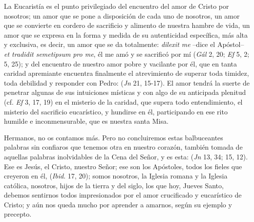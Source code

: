 \begin{body}
La Eucaristía es el punto privilegiado del encuentro del amor de Cristo por nosotros; un amor que se pone a disposición de cada uno de nosotros, un amor que se convierte en cordero de sacrificio y alimento de nuestra hambre de vida, un amor que se expresa en la forma y medida de su autenticidad específica, más alta y exclusiva, es decir, un amor que se da totalmente: \textit{dilexit me} –dice el Apóstol– \textit{et tradidit semetipsum} \textit{pro me}, él me amó y se sacrificó por mí (\textit{Gál} 2, 20; \textit{Ef} 5, 2; 5, 25); y del encuentro de nuestro amor pobre y vacilante por él, que en tanta caridad apremiante encuentra finalmente el atrevimiento de superar toda timidez, toda debilidad y responder con Pedro:  (\textit{Jn} 21, 15-17). El amor tendrá la suerte de penetrar algunas de sus intuiciones místicas y con algo de su anticipada plenitud (cf. \textit{Ef} 3, 17, 19) en el misterio de la caridad, que supera todo entendimiento, el misterio del sacrificio eucarístico, y hundirse en él, participando en ese rito humilde e inconmensurable, que es nuestra santa Misa. 

Hermanos, no os contamos más. Pero no concluiremos estas balbuceantes palabras sin confiaros que tenemos otra en nuestro corazón, también tomada de aquellas palabras inolvidables de la Cena del Señor, y es esta:  (\textit{Jn} 13, 34; 15, 12). Ese  es Jesús, el Cristo, nuestro Señor; ese  son los Apóstoles, todos los fieles que creyeron en él,  (\textit{Ibid}. 17, 20); somos nosotros, la Iglesia romana y la Iglesia católica, nosotros, hijos de la tierra y del siglo, los que hoy, Jueves Santo, debemos sentirnos todos impresionados por el amor crucificado y eucarístico de Cristo; y aún nos queda mucho por aprender a amarnos, según su ejemplo y precepto.
\end{body}

\label{b-05-01-1973H}


